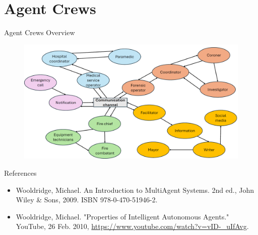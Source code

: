 \documentclass{beamer}
\begin{document}
\section{Agent Crews}
\begin{frame}{Agent Crews Overview}
    \begin{figure}[H]
        \centering
        \includegraphics[width=1\textwidth]{../figures/diagram_between_agents.png}
    \end{figure}
\end{frame}







\begin{frame}{References}
    \begin{itemize}
        \item Wooldridge, Michael. An Introduction to MultiAgent Systems. 2nd ed., John Wiley \& Sons, 2009. ISBN 978-0-470-51946-2.
        \item Wooldridge, Michael. "Properties of Intelligent Autonomous Agents." YouTube, 26 Feb. 2010, \url{https://www.youtube.com/watch?v=vID-_uIfAvg}.
    \end{itemize}
\end{frame}
\end{document}
